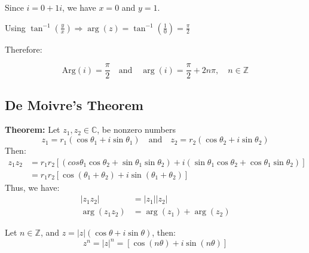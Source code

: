 \documentclass[a4paper, 10pt ]{article} %
\theoremstyle{definition}
\theoremstyle{plain}
\begin{document}
\begin{examplebox}
  Since $i = 0 + 1i$, we have $x = 0$ and $y = 1$.

  Using $\tan^{-1}\left(\frac{y}{x}\right) \Rightarrow \arg(z) = \tan^{-1}\left(\frac{1}{0}\right) = \frac{\pi}{2}$


  Therefore:

  $$ \text{Arg}(i) = \frac{\pi}{2} \quad \text{and} \quad \arg(i) = \frac{\pi}{2} + 2n\pi, \quad n \in \mathbb{Z} $$
\end{examplebox}

\subsection{De Moivre's Theorem}
\textbf{Theorem:} Let $z_1,z_2 \in \mathbb{C}$, be nonzero numbers
$$z_1 = r_1(\cos\theta_1 + i\sin\theta_1) \quad \text{and} \quad z_2 = r_2(\cos\theta_2 + i\sin\theta_2)$$
Then:
\begin{align*}
  z_1z_2 & = r_1r_2[(cos\theta_1\cos\theta_2  + \sin\theta_1\sin\theta_2) + i(\sin\theta_1\cos\theta_2 + \cos\theta_1\sin\theta_2)] \\
         & = r_1r_2[\cos(\theta_1 + \theta_2) + i\sin(\theta_1 + \theta_2)]
\end{align*}
Thus, we have:
\begin{align*}
  |z_1z_2|     & = |z_1||z_2|            \\
  \arg(z_1z_2) & = \arg(z_1) + \arg(z_2)
\end{align*}

\begin{theorembox}
  Let $n \in \mathbb{Z}$, and $z = |z|(\cos\theta + i\sin\theta)$, then:
  $$z^n = |z|^n = [\cos(n\theta) + i\sin(n\theta)]$$
\end{theorembox}
\end{document}
